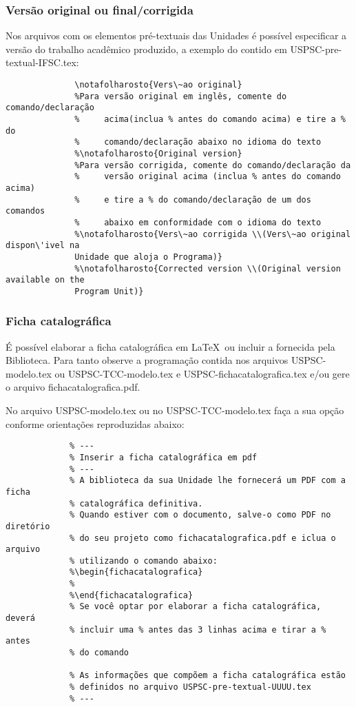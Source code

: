 \subsubsection{Versão original ou final/corrigida}
Nos arquivos com os elementos pré-textuais das Unidades é possível especificar a versão do trabalho acadêmico produzido, a exemplo do contido em USPSC-pre-textual-IFSC.tex:	  
			  \begin{verbatim}
			  \notafolharosto{Vers\~ao original}
			  %Para versão original em inglês, comente do comando/declaração 
			  %     acima(inclua % antes do comando acima) e tire a % do 
			  %     comando/declaração abaixo no idioma do texto
			  %\notafolharosto{Original version} 
			  %Para versão corrigida, comente do comando/declaração da 
			  %     versão original acima (inclua % antes do comando acima) 
			  %     e tire a % do comando/declaração de um dos comandos 
			  %     abaixo em conformidade com o idioma do texto
			  %\notafolharosto{Vers\~ao corrigida \\(Vers\~ao original dispon\'ivel na
			  Unidade que aloja o Programa)}
			  %\notafolharosto{Corrected version \\(Original version available on the
			  Program Unit)}
			  \end{verbatim}
			  
\subsubsection{Ficha catalográfica}
É possível elaborar a ficha catalográfica em \LaTeX\ ou incluir a fornecida pela Biblioteca. Para tanto observe a programação contida nos arquivos USPSC-modelo.tex ou USPSC-TCC-modelo.tex  e USPSC-fichacatalografica.tex e/ou gere o arquivo fichacatalografica.pdf.
	  
No arquivo USPSC-modelo.tex ou no USPSC-TCC-modelo.tex faça a sua opção conforme orientações reproduzidas abaixo:

			 \begin{verbatim}
			 % ---
			 % Inserir a ficha catalográfica em pdf
			 % ---
			 % A biblioteca da sua Unidade lhe fornecerá um PDF com a ficha
			 % catalográfica definitiva. 
			 % Quando estiver com o documento, salve-o como PDF no diretório
			 % do seu projeto como fichacatalografica.pdf e iclua o arquivo
			 % utilizando o comando abaixo:
			 %\begin{fichacatalografica}
			 %   
			 %\end{fichacatalografica}
			 % Se você optar por elaborar a ficha catalográfica, deverá 
			 % incluir uma % antes das 3 linhas acima e tirar a % antes
			 % do comando 
			 
			 % As informações que compõem a ficha catalográfica estão 
			 % definidos no arquivo USPSC-pre-textual-UUUU.tex
			 % ---
			 \end{verbatim} 
			 				
